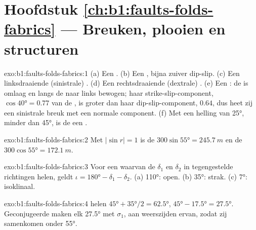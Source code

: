 \section*{Hoofdstuk \ref{ch:b1:faults-folds-fabrics} --- Breuken, plooien en structuren}

\begin{solution}{exo:b1:faults-folds-fabrics:1}
(a) Een . (b) Een , bijna zuiver dip-slip. (c) Een linksdraaiende (sinistrale) . (d) Een rechtsdraaiende (dextrale) . (e) Een : de  is omlaag en langs de  naar links bewogen; haar strike-slip-component, $\cos\ang{40} = 0.77$ van de , is groter dan haar dip-slip-component, $0.64$, dus heet zij een sinistrale breuk met een normale component. (f) Met een helling van \ang{25}, minder dan \ang{45}, is de  een .
\end{solution}

\begin{solution}{exo:b1:faults-folds-fabrics:2}
Met $|\sin r| = 1$ is de  $300\sin\ang{55} = \qty{245.7}{m}$ en de
 $300\cos\ang{55} = \qty{172.1}{m}$.
\end{solution}

\begin{solution}{exo:b1:faults-folds-fabrics:3}
Voor een  waarvan de  $\delta_1$ en $\delta_2$ in tegengestelde richtingen helen, geldt $\iota = \ang{180} - \delta_1 - \delta_2$. (a) \ang{110}: open. (b) \ang{35}: strak. (c) \ang{7}: isoklinaal.
\end{solution}

\begin{solution}{exo:b1:faults-folds-fabrics:4}
 helen $\ang{45} + \ang{35}/2 = \ang{62.5}$, 
$\ang{45} - \ang{17.5} = \ang{27.5}$. Geconjugeerde  maken elk
\ang{27.5} met $\sigma_1$, aan weerszijden ervan, zodat zij samenkomen onder \ang{55}.
\end{solution}

